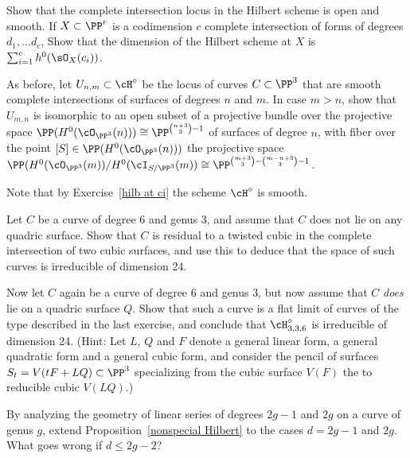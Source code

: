\begin{exercise}\label{hilb at a ci}
Show that the complete intersection locus in the Hilbert scheme is open and smooth.
If $X\subset \PP^r$ is a codimension $c$ complete intersection of forms of degrees $d_1,\dots d_c$,
Show that the dimension of the Hilbert scheme at $X$ is $\sum_{i = 1}^c h^0(\sO_X(c_i))$.
 
\end{exercise}
\begin{exercise}\label{second complete intersection exercise}
As before, let $U_{n,m} \subset \cH^\circ$ be the locus of curves $C \subset \PP^3$ that are smooth complete intersections of surfaces of degrees $n$ and $m$.
 In case $m > n$, show that $U_{m,n}$ is isomorphic to an open subset of a projective bundle over the projective space $\PP(H^0(\cO_{\PP^3}(n))) \cong \PP^{\binom{n+3}{3}-1}$ of surfaces of degree $n$, with fiber over the point $[S] \in \PP(H^0(\cO_{\PP^3}(n)))$ the projective space $\PP(H^0(\cO_{\PP^3}(m))/H^0(\cI_{S/\PP^3}(m)) \cong \PP^{\binom{m+3}{3} - \binom{m-n+3}{3} - 1}$.
 
 Note that  by Exercise~\ref{hilb at ci}  the scheme $\cH^\circ$ is smooth.
\end{exercise}

\begin{exercise}\label{6,3:1}
Let $C$ be a curve of degree 6 and genus 3, and assume that $C$ does not lie on any quadric surface. Show that $C$ is residual to a twisted cubic in the complete intersection of two cubic surfaces, and use this to deduce that the space of such curves is irreducible of dimension 24.
\end{exercise}


\begin{exercise}\label{6,3:2}
Now let $C$ again be a curve of degree 6 and genus 3, but now assume that $C$ \emph{does} lie on a quadric surface $Q$. Show that such a curve is a flat limit of curves of the type described in the last exercise, and conclude that $\cH^\circ_{3,3,6}$ is irreducible of dimension 24. (Hint: Let $L$, $Q$ and $F$ denote a general linear form, a general quadratic form and a general cubic form, and consider the pencil of surfaces $S_t = V(tF + LQ) \subset \PP^3$ specializing from the cubic surface $V(F)$ the to reducible cubic $V(LQ)$.)
\end{exercise}

\begin{exercise}
By analyzing the geometry of linear series of degrees $2g-1$ and $2g$ on a curve of genus $g$, extend Proposition~\ref{nonspecial Hilbert} to the cases $d = 2g-1$ and $2g$. What goes wrong if $d \leq 2g-2$?
\end{exercise}

